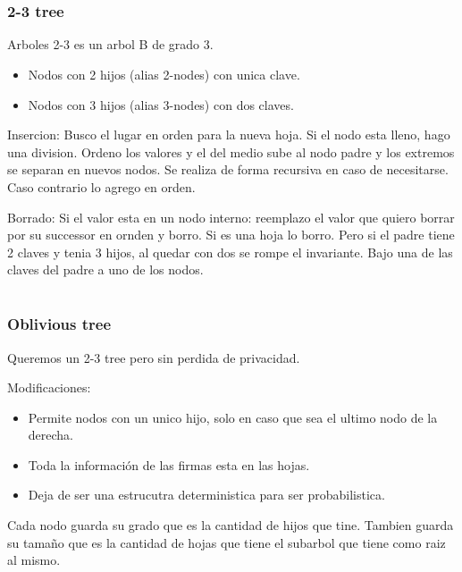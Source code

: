 \documentclass[10pt,handout]{beamer}
\begin{document}
\section{}
\begin{frame}
\frametitle{2-3 tree}

Arboles 2-3 es un arbol B de grado 3.
\begin{itemize}
  \item Nodos con 2 hijos (alias 2-nodes) con unica clave.
  \item Nodos con 3 hijos (alias 3-nodes) con dos claves.
\end{itemize}

Insercion: Busco el lugar en orden para la nueva hoja. Si el nodo esta lleno, hago una division.
Ordeno los valores y el del medio sube al nodo padre y los extremos se separan en nuevos nodos.
Se realiza de forma recursiva en caso de necesitarse.
Caso contrario lo agrego en orden.

Borrado: Si el valor esta en un nodo interno: reemplazo el valor que quiero borrar por su
successor en ornden y borro.
Si es una hoja lo borro. Pero si el padre tiene 2 claves y tenia 3 hijos, al quedar con dos se rompe el invariante.
Bajo una de las claves del padre a uno de los nodos.
\end{frame}




\section{}
\begin{frame}
\frametitle{Oblivious tree}

Queremos un 2-3 tree pero sin perdida de privacidad.

Modificaciones:
\begin{itemize}
  \item Permite nodos con un unico hijo, solo en caso que sea el ultimo nodo de la derecha.
  \item Toda la información de las firmas esta en las hojas.
  \item Deja de ser una estrucutra deterministica para ser probabilistica.
\end{itemize}

Cada nodo guarda su grado que es la cantidad de hijos que tine.
Tambien guarda su tamaño que es la cantidad de hojas que tiene el subarbol que tiene como
raiz al mismo.
\end{frame}
\end{document}
